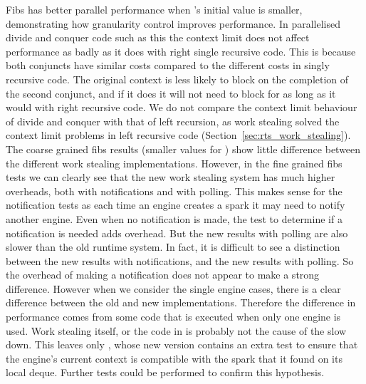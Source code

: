 

Fibs has better parallel performance when \Depth's initial value is
smaller,
demonstrating how granularity control improves performance.
In parallelised divide and conquer code such as this the context limit does
not affect performance as badly as it does with right single recursive code.
This is because both conjuncts have similar costs compared to the different
costs in singly recursive code.
The original context is less likely to block on the completion of the second
conjunct,
and if it does it will not need to block for as long as it would
with right recursive code.
We do not compare the context limit behaviour of divide and conquer with that
of left recursion,
as work stealing solved the context limit problems in left recursive code
(Section~\ref{sec:rts_work_stealing}).
The coarse grained fibs results (smaller values for \Depth)
show little difference between the different work stealing implementations.
However,
in the fine grained fibs tests we can clearly see that the new work stealing
system has much higher overheads,
both with notifications and with polling.
This makes sense for the notification tests
as each time an engine creates a spark it may need to notify another
engine.
Even when no notification is made,
the test to determine if a notification is needed adds overhead.
But the new results with polling are also slower than the old runtime
system.
In fact,
it is difficult to see a distinction between
the new results with notifications, and the new results with polling.
So the overhead of making a notification does not appear to make a strong
difference.
However when we consider the single engine cases,
there is a clear difference between the old and new implementations.
Therefore the difference in performance comes from some code that is
executed when only one engine is used.
Work stealing itself, or the code in \idle is probably not the cause of the
slow down.
This leaves only \joinandcontinue,
whose new version contains an extra test to ensure that the engine's current
context is compatible with the spark that it found on its local deque.
Further tests could be performed to confirm this hypothesis.

